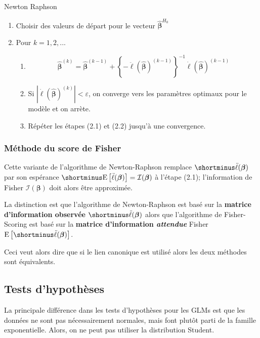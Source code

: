 \documentclass[10pt, french]{article}
\begin{document}
\begin{multicols*}{3}
\begin{algo}{Newton Raphson}
\begin{enumerate}[label = (\arabic*)]
	\item	Choisir des valeurs de départ pour le vecteur $\hat{\bm{\beta}}^{H_0}$
	\item	Pour $k = 1, 2, ...$
	\begin{enumerate}[label = (2.\arabic*)]
		\item	
		\begin{equation*}
		\hat{\bm{\beta}}^{(k)} 
			= 	\hat{\bm{\beta}}^{(k-1)} +  
				\left \{ - \ddot{\ell}(\hat{\bm{\beta}})^{(k-1)} \right \}^{-1} 
				\dot{\ell}(\hat{\bm{\beta}})^{(k-1)}
		\end{equation*}
		\item	Si $|\dot{\ell}(\hat{\bm{\beta}})^{(k)}| < \varepsilon $, on converge vers les paramètres optimaux pour le modèle et on arrète.
		\item	Répéter les étapes (2.1) et (2.2) jusqu'à une convergence.
\end{enumerate}
\end{enumerate}
\end{algo}

\subsubsection*{Méthode du score de Fisher}

Cette variante de l'algorithme de Newton-Raphson remplace $\shortminus\ddot{\ell}(\bm{\beta})$ par son espérance $\shortminus\esp{\ddot{\ell}(\bm{\beta})} = \mathcal{I}(\bm{\beta})$ à l'étape (2.1); l'information de Fisher $\mathcal{I}(\bm{\beta})$ doit alors être approximée.

La distinction est que l'algorithme de Newton-Raphson est basé sur la \textbf{matrice d'information observée} $\shortminus\ddot{\ell}(\bm{\beta})$ alors que l'algorithme de Fisher-Scoring est basé sur la \textbf{matrice d'information \textit{attendue}} Fisher $\esp{\shortminus\ddot{\ell}(\bm{\beta})}$.

Ceci veut alors dire que si le lien canonique est utilisé alors les deux méthodes sont équivalents.

\subsection*{Tests d'hypothèses}

La principale différence dans les tests d'hypothèses pour les GLMs est que les données ne sont pas nécessairement normales, mais font plutôt parti de la famille exponentielle. Alors, on ne peut pas utiliser la distribution Student.


\end{multicols*}
\end{document}
